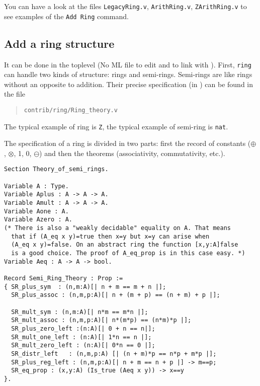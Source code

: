 You can have a look at the files \texttt{LegacyRing.v},
\texttt{ArithRing.v}, \texttt{ZArithRing.v} to see examples of the
\texttt{Add Ring} command.

\subsection{Add a ring structure}

It can be done in the \Coq toplevel (No ML file to edit and to link
with \Coq). First, \texttt{ring} can handle two kinds of structure:
rings and semi-rings. Semi-rings are like rings without an opposite to
addition. Their precise specification (in \gallina) can be found in
the file

\begin{quotation}
\begin{verbatim}
contrib/ring/Ring_theory.v
\end{verbatim}
\end{quotation}

The typical example of ring is \texttt{Z}, the typical
example of semi-ring is \texttt{nat}.

The specification of a
ring is divided in two parts: first the record of constants
($\oplus$, $\otimes$, 1, 0, $\ominus$) and then the theorems
(associativity, commutativity, etc.).

\begin{small}
\begin{flushleft}
\begin{verbatim}
Section Theory_of_semi_rings.

Variable A : Type.
Variable Aplus : A -> A -> A.
Variable Amult : A -> A -> A.
Variable Aone : A.
Variable Azero : A.
(* There is also a "weakly decidable" equality on A. That means 
  that if (A_eq x y)=true then x=y but x=y can arise when 
  (A_eq x y)=false. On an abstract ring the function [x,y:A]false
  is a good choice. The proof of A_eq_prop is in this case easy. *)
Variable Aeq : A -> A -> bool.

Record Semi_Ring_Theory : Prop :=
{ SR_plus_sym  : (n,m:A)[| n + m == m + n |];
  SR_plus_assoc : (n,m,p:A)[| n + (m + p) == (n + m) + p |];

  SR_mult_sym : (n,m:A)[| n*m == m*n |];
  SR_mult_assoc : (n,m,p:A)[| n*(m*p) == (n*m)*p |];
  SR_plus_zero_left :(n:A)[| 0 + n == n|];
  SR_mult_one_left : (n:A)[| 1*n == n |];
  SR_mult_zero_left : (n:A)[| 0*n == 0 |];
  SR_distr_left   : (n,m,p:A) [| (n + m)*p == n*p + m*p |];
  SR_plus_reg_left : (n,m,p:A)[| n + m == n + p |] -> m==p;
  SR_eq_prop : (x,y:A) (Is_true (Aeq x y)) -> x==y
}.
\end{verbatim}
\end{flushleft}
\end{small}

